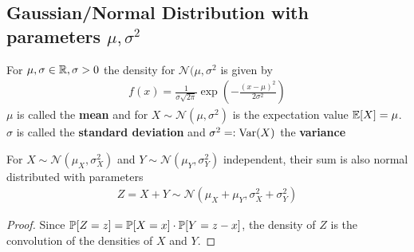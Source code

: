 \subsection{Gaussian/Normal Distribution with parameters $\mu,\sigma^{2}$}

For $\mu,\sigma \in \mathbb{R},\sigma > 0$ the density for $\mathcal{N}(\mu,\sigma^{2}$ is given by
\begin{align*}
  f(x) = \frac{1}{\sigma \sqrt{2 \pi}} \exp\left(
    - \frac{(x - \mu)^{2}}{2 \sigma^{2}}
  \right)
\end{align*}
$\mu$ is called the \textbf{mean} and for 
$X \sim \mathcal{N}(\mu,\sigma^{2})$ is the expectation value $\mathbb{E}[X] = \mu$.
$\sigma$ is called the \textbf{standard deviation} and $\sigma^{2} =: \operatorname{Var}(X)$ the \textbf{variance}

\begin{lem}[]
  For $X \sim \mathcal{N}(\mu_X,\sigma_X^{2})$ and $Y \sim \mathcal{N}(\mu_Y,\sigma_Y^2)$ independent, their sum is also normal distributed with parameters
  \begin{align*}
    Z = X + Y \sim \mathcal{N}(\mu_X + \mu_Y, \sigma_X^{2} + \sigma_Y^{2})
  \end{align*}
\end{lem}
\begin{proof}
  Since $\mathbb{P}[Z = z] = \mathbb{P}[X = x] \cdot \mathbb{P}[Y = z-x]$, the density of $Z$ is the convolution of the densities of $X$ and $Y$.

\end{proof}


